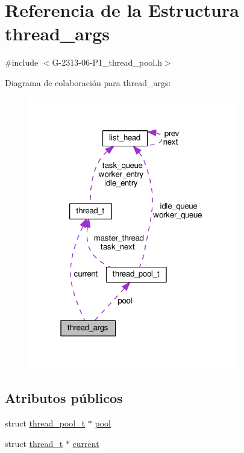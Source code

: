 \hypertarget{structthread__args}{}\section{Referencia de la Estructura thread\+\_\+args}
\label{structthread__args}


{\ttfamily \#include $<$G-\/2313-\/06-\/\+P1\+\_\+thread\+\_\+pool.\+h$>$}



Diagrama de colaboración para thread\+\_\+args\+:\nopagebreak
\begin{figure}[H]
\begin{center}
\leavevmode
\includegraphics[width=256pt]{structthread__args__coll__graph}
\end{center}
\end{figure}
\subsection*{Atributos públicos}
\begin{DoxyCompactItemize}
\item 
struct \hyperlink{structthread__pool__t}{thread\+\_\+pool\+\_\+t} $\ast$ \hyperlink{structthread__args_a425ced5f77dcbb52f61d240a4e207a27}{pool}
\item 
struct \hyperlink{structthread__t}{thread\+\_\+t} $\ast$ \hyperlink{structthread__args_a191f3ea514283452d04bde31cde4c7ad}{current}
\end{DoxyCompactItemize}


